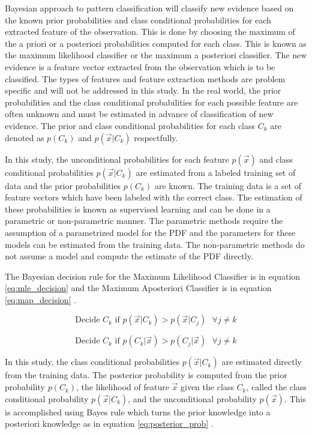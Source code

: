 \documentclass[journal]{IEEEtran}
\begin{document}
 Bayesian approach to pattern classification will classify new evidence based on the known prior probabilities and class conditional probabilities for each extracted feature of the observation. This is done by choosing the maximum of the a priori or a posteriori probabilities computed for each class. This is known as the maximum likelihood classifier or the maximum a posteriori classifier. The new evidence is a feature vector extracted from the observation which is to be classified. The types of features and feature extraction methods are problem specific and will not be addressed in this study. In the real world, the prior probabilities and the class conditional probabilities for each possible feature are often unknown and must be estimated in advance of classification of new evidence. The prior and class conditional probabilities for each class \(C_k\) are denoted as \(p(C_k)\) and \(p(\vec{x} \vert C_k)\) respectfully.
\par In this study, the unconditional probabilities for each feature \(p(\vec{x})\) and class conditional probabilities \(p(\vec{x}\vert C_k)\) are estimated from a labeled training set of data and the prior probabilities \(p(C_k)\) are known. The training data is a set of feature vectors which have been labeled with the correct class. The estimation of these probabilities is known as supervised learning and can be done in a parametric or non-parametric manner. The parametric methods require the assumption of a parametrized model for the PDF and the parameters for these models can be estimated from the training data. The non-parametric methods do not assume a model and compute the estimate of the PDF directly.
\par The Bayesian decision rule for the Maximum Likelihood Classifier is in equation \ref{eq:mle_decision} and the Maximum Aposteriori Classifier is in equation \ref{eq:map_decision} \cite[p.~17-23]{bishop}.

\begin{equation}
\label{eq:mle_decision}
\text{Decide  } C_k \text{  if  } p(\vec{x} \vert C_k) > p(\vec{x} \vert C_j) \text{    } \forall j \neq k
\end{equation}

\begin{equation}
\label{eq:map_decision}
\text{Decide  } C_k \text{  if  } p(C_k\vert \vec{x}) > p(C_j\vert \vec{x}) \text{    } \forall j \neq k
\end{equation}

\par In this study, the class conditional probabilities \(p(\vec{x} \vert C_k)\) are estimated directly from the training data. The posterior probability is computed from the prior probability \(p(C_k)\), the likelihood of feature \(\vec{x}\) given the class \(C_k\), called the class conditional probability \(p(\vec{x} \vert C_k)\), and the unconditional probability \(p(\vec{x})\). This is accomplished using Bayes rule which turns the prior knowledge into a posteriori knowledge as in equation \ref{eq:posterior_prob} \cite[p.18]{bishop}.
\end{document}

